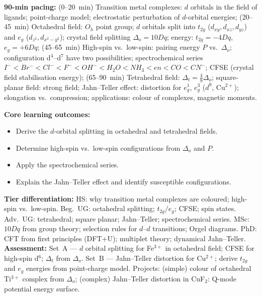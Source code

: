 \documentclass[11pt,a4paper]{article}
\begin{document}
\begin{tcolorbox}[chembox, title={Module~III.3 --- Lecture L08: Crystal Field Theory}]
\textbf{90-min pacing:} (0--20~min) Transition metal complexes: $d$ orbitals in the field of ligands; point-charge model; electrostatic perturbation of $d$-orbital energies; (20--45~min) Octahedral field: $O_h$ point group; $d$ orbitals split into $t_{2g}$ ($d_{xy},d_{xz},d_{yz}$) and $e_g$ ($d_{z^2},d_{x^2-y^2}$); crystal field splitting $\Delta_o=10Dq$; energy: $t_{2g}=-4Dq$, $e_g=+6Dq$; (45--65~min) High-spin vs.\ low-spin: pairing energy $P$ vs.\ $\Delta_o$; configuration d$^4$--d$^7$ have two possibilities; spectrochemical series $I^-<Br^-<Cl^-<F^-<OH^-<H_2O<NH_3<en<CO<CN^-$; CFSE (crystal field stabilisation energy); (65--90~min) Tetrahedral field: $\Delta_t=\tfrac{4}{9}\Delta_o$; square-planar field: strong field; Jahn--Teller effect: distortion for $e_g^1$, $e_g^3$ ($d^9$, Cu$^{2+}$); elongation vs.\ compression; applications: colour of complexes, magnetic moments.

\medskip\textbf{Core learning outcomes:}
\begin{itemize}[leftmargin=1.4em,topsep=2pt,itemsep=1pt]
  \item Derive the $d$-orbital splitting in octahedral and tetrahedral fields.
  \item Determine high-spin vs.\ low-spin configurations from $\Delta_o$ and $P$.
  \item Apply the spectrochemical series.
  \item Explain the Jahn--Teller effect and identify susceptible configurations.
\end{itemize}
\medskip\textbf{Tier differentiation:}
HS: why transition metal complexes are coloured; high-spin vs.\ low-spin.
Beg.\ UG: octahedral splitting; $t_{2g}/e_g$; CFSE; spin states.
Adv.\ UG: tetrahedral; square planar; Jahn--Teller; spectrochemical series.
MSc: $10Dq$ from group theory; selection rules for $d$--$d$ transitions; Orgel diagrams.
PhD: CFT from first principles (DFT+U); multiplet theory; dynamical Jahn--Teller.
\medskip\textbf{Assessment:}
Set~A --- $d$ orbital splitting for Fe$^{3+}$ in octahedral field; CFSE for high-spin d$^6$; $\Delta_t$ from $\Delta_o$.
Set~B --- Jahn--Teller distortion for Cu$^{2+}$; derive $t_{2g}$ and $e_g$ energies from point-charge model.
Projects: (simple) colour of octahedral Ti$^{3+}$ complex from $\Delta_o$; (complex) Jahn--Teller distortion in CuF$_2$: Q-mode potential energy surface.
\end{tcolorbox}
\end{document}
